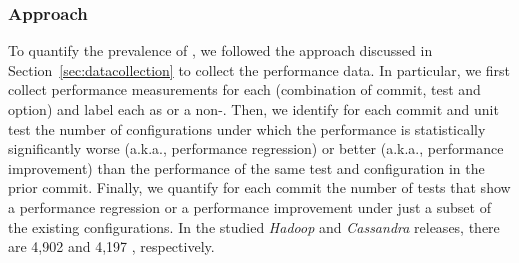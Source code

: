 \subsubsection*{Approach}
To quantify the prevalence of \inconsistent, we followed the approach discussed in Section~\ref{sec:datacollection} to collect the performance data. In particular, we first collect performance measurements for each \textbf{\instance} (combination of commit, test and option) and label each \instance as \inconsistent or a non-\inconsistent. %
Then, we identify for each commit and unit test the number of configurations under which the performance is statistically significantly worse (a.k.a., performance regression) or better (a.k.a., performance improvement) than the performance of the same test and configuration in the prior commit. Finally, we quantify for each commit the number of tests that show a performance regression or a performance improvement under just a subset of the existing configurations. %
In the studied \emph{Hadoop} and \emph{Cassandra} releases, there are 4,902 and 4,197 \instance, respectively. 




